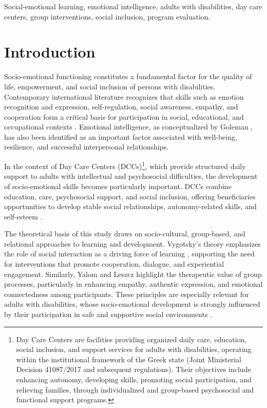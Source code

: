\documentclass[journal]{IEEEtran}
\begin{document}
\begin{IEEEkeywords}
Social-emotional learning, emotional intelligence, adults with disabilities, day care centers, group interventions, social inclusion, program evaluation.
\end{IEEEkeywords}

\section{Introduction}

Socio-emotional functioning constitutes a fundamental factor for the quality of life, empowerment, and social inclusion of persons with disabilities. Contemporary international literature recognizes that skills such as emotion recognition and expression, self-regulation, social awareness, empathy, and cooperation form a critical basis for participation in social, educational, and occupational contexts \cite{casel2020,weissberg2015}. Emotional intelligence, as conceptualized by Goleman \cite{goleman1995}, has also been identified as an important factor associated with well-being, resilience, and successful interpersonal relationships.

In the context of Day Care Centers (DCCs)\footnote{Day Care Centers are facilities providing organized daily care, education, social inclusion, and support services for adults with disabilities, operating within the institutional framework of the Greek state (Joint Ministerial Decision 41087/2017 and subsequent regulations). Their objectives include enhancing autonomy, developing skills, promoting social participation, and relieving families, through individualized and group-based psychosocial and functional support programs.}, which provide structured daily support to adults with intellectual and psychosocial difficulties, the development of socio-emotional skills becomes particularly important. DCCs combine education, care, psychosocial support, and social inclusion, offering beneficiaries opportunities to develop stable social relationships, autonomy-related skills, and self-esteem \cite{westmore2024}.

The theoretical basis of this study draws on socio-cultural, group-based, and relational approaches to learning and development. Vygotsky's theory emphasizes the role of social interaction as a driving force of learning \cite{vygotsky1978}, supporting the need for interventions that promote cooperation, dialogue, and experiential engagement. Similarly, Yalom and Leszcz \cite{yalom2005} highlight the therapeutic value of group processes, particularly in enhancing empathy, authentic expression, and emotional connectedness among participants. These principles are especially relevant for adults with disabilities, whose socio-emotional development is strongly influenced by their participation in safe and supportive social environments \cite{shogren2017}.
\end{document}

